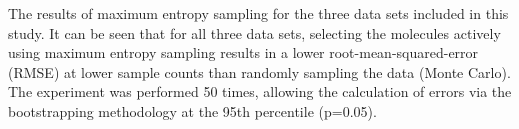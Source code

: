 The results of maximum entropy sampling for the three data sets included in this study.  It can be seen that for all three data sets, selecting the molecules actively using maximum entropy sampling results in a lower root-mean-squared-error (RMSE) at lower sample counts than randomly sampling the data (Monte Carlo). The experiment was performed 50 times, allowing the calculation of errors via the bootstrapping methodology at the 95th percentile (p=0.05).\label{fig:max_entropy}